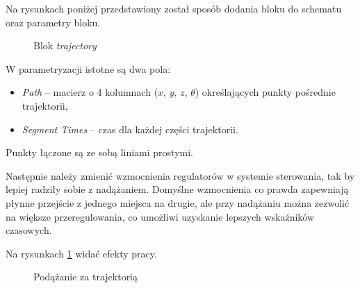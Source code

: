 \documentclass[11pt, a4paper]{article}
\begin{document}
Na rysunkach poniżej przedstawiony został sposób dodania bloku do schematu oraz parametry bloku.
\begin{figure}[htbp!]
	\centering
	
	\hfill%
	
	\caption{Blok \emph{trajectory}}
\end{figure}

W parametryzacji istotne są dwa pola:
\begin{itemize}
\item \emph{Path} -- macierz o 4 kolumnach ($x$, $y$, $z$, $\theta$) określających punkty pośrednie trajektorii,
\item \emph{Segment Times} -- czas dla każdej części trajektorii.
\end{itemize}

Punkty łączone są ze sobą liniami prostymi.

Następnie należy zmienić wzmocnienia regulatorów w systemie sterowania, tak by lepiej radziły sobie z nadążaniem. Domyślne wzmocnienia co prawda zapewniają płynne przejście z jednego miejsca na drugie, ale przy nadążaniu można zezwolić na większe przeregulowania, co umożliwi uzyskanie lepszych wskaźników czasowych.

Na rysunkach \ref{fig:mobile16k} widać efekty pracy.
\begin{figure}[htbp!]
	\centering
	
	\hfill%
	
	\caption{Podążanie za trajektorią \label{fig:mobile16k}}
\end{figure}
\end{document}

